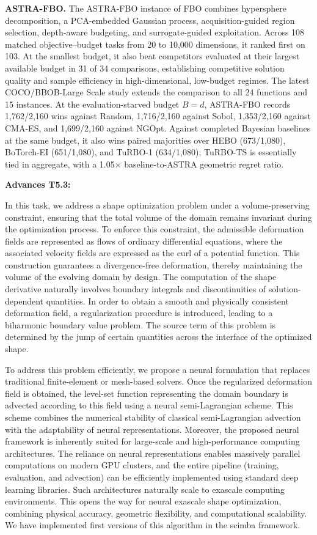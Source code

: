 \textbf{ASTRA-FBO.}
The ASTRA-FBO instance of FBO combines hypersphere decomposition, a PCA-embedded Gaussian process, acquisition-guided region selection, depth-aware budgeting, and surrogate-guided exploitation. Across 108 matched objective--budget tasks from 20 to 10,000 dimensions, it ranked first on 103. At the smallest budget, it also beat competitors evaluated at their largest available budget in 31 of 34 comparisons, establishing competitive solution quality and sample efficiency in high-dimensional, low-budget regimes. The latest COCO/BBOB-Large Scale study extends the comparison to all 24 functions and 15 instances. At the evaluation-starved budget $B=d$, ASTRA-FBO records 1,762/2,160 wins against Random, 1,716/2,160 against Sobol, 1,353/2,160 against CMA-ES, and 1,699/2,160 against NGOpt. Against completed Bayesian baselines at the same budget, it also wins paired majorities over HEBO (673/1,080), BoTorch-EI (651/1,080), and TuRBO-1 (634/1,080); TuRBO-TS is essentially tied in aggregate, with a 1.05$\times$ baseline-to-ASTRA geometric regret ratio.

\medskip

{\bf Advances T5.3:}

In this task, we address a shape optimization problem under a
volume-preserving constraint, ensuring that the total volume of the
domain remains invariant during the optimization process. To enforce
this constraint, the admissible deformation fields are represented as
flows of ordinary differential equations, where the associated velocity
fields are expressed as the curl of a potential function. This
construction guarantees a divergence-free deformation, thereby
maintaining the volume of the evolving domain by design. The computation
of the shape derivative naturally involves boundary integrals and
discontinuities of solution-dependent quantities. In order to obtain a
smooth and physically consistent deformation field, a regularization
procedure is introduced, leading to a biharmonic boundary value problem.
The source term of this problem is determined by the jump of certain
quantities across the interface of the optimized shape.

To address this problem efficiently, we propose a neural formulation
that replaces traditional finite-element or mesh-based solvers. Once the
regularized deformation field is obtained, the level-set function
representing the domain boundary is advected according to this field
using a neural semi-Lagrangian scheme. This scheme combines the
numerical stability of classical semi-Lagrangian advection with the
adaptability of neural representations. Moreover, the proposed neural
framework is inherently suited for large-scale and high-performance
computing architectures. The reliance on neural representations enables
massively parallel computations on modern GPU clusters, and the entire
pipeline (training, evaluation, and advection) can be efficiently
implemented using standard deep learning libraries. Such architectures
naturally scale to exascale computing environments. This opens the way
for neural exascale shape optimization, combining physical accuracy,
geometric flexibility, and computational scalability. We have
implemented first versions of this algorithm in the scimba framework.

